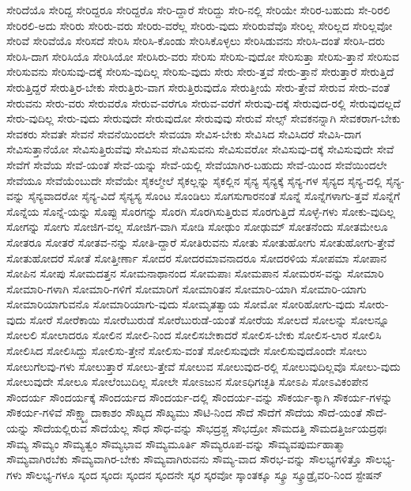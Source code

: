 {ಸೇರಿದೆಯೊ
ಸೇರಿದ್ದ
ಸೇರಿದ್ದರೂ
ಸೇರಿದ್ದರೊ
ಸೇರಿ-ದ್ದಾರೆ
ಸೇರಿದ್ದು
ಸೇರಿ-ನಲ್ಲಿ
ಸೇರಿಯೇ
ಸೇರಿರ-ಬಹುದು
ಸೇ-ರಿರಲಿ
ಸೇರಿರಲಿ-ಅದು
ಸೇರಿರು
ಸೇರಿರು-ವರು
ಸೇರಿರು-ವರೆಲ್ಲ
ಸೇರಿರು-ವುದು
ಸೇರಿರುವೆವೊ
ಸೇರಿಲ್ಲ
ಸೇರಿಲ್ಲದ
ಸೇರಿಲ್ಲವೋ
ಸೇರಿವೆ
ಸೇರಿವೆಯೊ
ಸೇರಿಸದೆ
ಸೇರಿಸಿ
ಸೇರಿಸಿ-ಕೊಂಡು
ಸೇರಿಸಿಕೊಳ್ಳಲು
ಸೇರಿಸಿಡುವನು
ಸೇರಿಸಿ-ದಂತೆ
ಸೇರಿಸಿ-ದರು
ಸೇರಿಸಿ-ದಾಗ
ಸೇರಿಸಿಯೊ
ಸೇರಿಸಿಯೋ
ಸೇರಿಸಿರು-ವರು
ಸೇರಿಸು
ಸೇರಿಸು-ವುದೋ
ಸೇರಿಸುತ್ತಾ
ಸೇರಿಸು-ತ್ತಾನೆ
ಸೇರಿಸುವ
ಸೇರಿಸುವನು
ಸೇರಿಸುವು-ದಕ್ಕೆ
ಸೇರಿಸು-ವುದಿಲ್ಲ
ಸೇರಿಸು-ವುದು
ಸೇರು
ಸೇರು-ತ್ತವೆ
ಸೇರು-ತ್ತಾನೆ
ಸೇರುತ್ತಾರೆ
ಸೇರುತ್ತಿದೆ
ಸೇರುತ್ತಿದ್ದರೆ
ಸೇರುತ್ತಿರ-ಬೇಕು
ಸೇರುತ್ತಿರು-ವಾಗ
ಸೇರುತ್ತಿರುವುದೊ
ಸೇರುತ್ತೀಯೆ
ಸೇರು-ತ್ತೇವೆ
ಸೇರುವ
ಸೇರು-ವಂತೆ
ಸೇರುವನು
ಸೇರು-ವರು
ಸೇರುವರೊ
ಸೇರುವ-ವರೆಗೂ
ಸೇರುವ-ವರೆಗೆ
ಸೇರುವು-ದಕ್ಕೆ
ಸೇರುವುದ-ರಲ್ಲಿ
ಸೇರುವುದಲ್ಲದೆ
ಸೇರು-ವುದಿಲ್ಲ
ಸೇರು-ವುದು
ಸೇರುವುದೇ
ಸೇರುವುದೋ
ಸೇರುವುವು
ಸೇರುವೆ
ಸೇಲ್ಸ್
ಸೇವಕನನ್ನಾಗಿ
ಸೇವಕರಾಗ-ಬೇಕು
ಸೇವಕರು
ಸೇವತೇ
ಸೇವನೆ
ಸೇವನೆಯಿಂದಲೇ
ಸೇವಯಾ
ಸೇವಿಸ-ಬೇಕು
ಸೇವಿಸಿದ
ಸೇವಿಸಿದರೆ
ಸೇವಿಸಿ-ದಾಗ
ಸೇವಿಸುತ್ತಾನೆಯೋ
ಸೇವಿಸುತ್ತಿರುವೆವು
ಸೇವಿಸುವ
ಸೇವಿಸುವನು
ಸೇವಿಸುವರೋ
ಸೇವಿಸುವು-ದಕ್ಕೆ
ಸೇವಿಸುವುದೇ
ಸೇವೆ
ಸೇವೆಗೆ
ಸೇವೆಯ
ಸೇವೆ-ಯಂತೆ
ಸೇವೆ-ಯನ್ನು
ಸೇವೆ-ಯಲ್ಲಿ
ಸೇವೆಯಾಗಿರ-ಬಹುದು
ಸೇವೆ-ಯಿಂದ
ಸೇವೆಯಿಂದಲೇ
ಸೇವೆಯೂ
ಸೇವೆಯೆಂಬುದೇ
ಸೇವೆಯೇ
ಸೈಕಲ್ಮೇಲೆ
ಸೈಕಲ್ಲನ್ನು
ಸೈಕಲ್ಲಿನ
ಸೈನ್ಯ
ಸೈನ್ಯಕ್ಕೆ
ಸೈನ್ಯ-ಗಳ
ಸೈನ್ಯದ
ಸೈನ್ಯ-ದಲ್ಲಿ
ಸೈನ್ಯ-ವನ್ನು
ಸೈನ್ಯವಾದರೋ
ಸೈನ್ಯ-ವಿದೆ
ಸೈನ್ಯಸ್ಯ
ಸೊಂಟ
ಸೊಂಡಿಲು
ಸೊಗಸುಗಾರನಂತೆ
ಸೊನ್ನೆ
ಸೊನ್ನೆಗಳಾಗು-ತ್ತವೆ
ಸೊನ್ನೆಗೆ
ಸೊನ್ನೆಯ
ಸೊನ್ನೆ-ಯನ್ನು
ಸೊಪ್ಪು
ಸೊರಗನ್ನು
ಸೊರಗಿ
ಸೊರಗಿಸುತ್ತಿರುವ
ಸೊರಗುತ್ತಿದೆ
ಸೊಳ್ಳೆ-ಗಳು
ಸೋಕು-ವುದಿಲ್ಲ
ಸೋಗನ್ನು
ಸೋಗು
ಸೋಜಿಗ-ವಲ್ಲ
ಸೋಜಿಗ-ವಾಗಿ
ಸೋಡಿ
ಸೋಢುಂ
ಸೋಢುಮ್
ಸೋತನೆಂದು
ಸೋತಮೇಲೂ
ಸೋತರೂ
ಸೋತರೆ
ಸೋತವ-ನನ್ನು
ಸೋತಿ-ದ್ದಾರೆ
ಸೋತಿರುವನು
ಸೋತು
ಸೋತುಹೋಗು
ಸೋತುಹೋಗು-ತ್ತೇವೆ
ಸೋತುಹೋದರೆ
ಸೋತೆ
ಸೋತ್ತೀರ್ಣಾ
ಸೋದರ
ಸೋದರಮಾವನಾದರೂ
ಸೋದರಳಿಯ
ಸೋಪಮಾ
ಸೋಪಾನ
ಸೋಪಿನ
ಸೋಪು
ಸೋಮದತ್ತನ
ಸೋಮನಾಥಾನಂದ
ಸೋಮಪಾಃ
ಸೋಮಪಾನ
ಸೋಮರಸ-ವನ್ನು
ಸೋಮಾರಿ
ಸೋಮಾರಿ-ಗಳಾಗಿ
ಸೋಮಾರಿ-ಗಳಿಗೆ
ಸೋಮಾರಿಗೆ
ಸೋಮಾರಿತನ
ಸೋಮಾರಿ-ಯಾಗಿ
ಸೋಮಾರಿ-ಯಾಗು
ಸೋಮಾರಿಯಾಗುವನೊ
ಸೋಮಾರಿಯಾಗು-ವುದು
ಸೋಮೃತತ್ವಾಯ
ಸೋಮೋ
ಸೋರಿಹೋಗು-ವುದು
ಸೋರು-ವುದು
ಸೋರೆ
ಸೋರೆಕಾಯಿ
ಸೋರೆಬುರುಡೆ
ಸೋರೆಬುರುಡೆ-ಯಂತೆ
ಸೋರೆಯ
ಸೋಲದೆ
ಸೋಲನ್ನು
ಸೋಲನ್ನೂ
ಸೋಲಲಿ
ಸೋಲಾದರೂ
ಸೋಲಿನ
ಸೋಲಿ-ನಿಂದ
ಸೋಲಿಸಬೇಕಾದರೆ
ಸೋಲಿಸ-ಬೇಕು
ಸೋಲಿಸ-ಲಾರ
ಸೋಲಿಸಿ
ಸೋಲಿಸಿದ
ಸೋಲಿಸಿದ್ದು
ಸೋಲಿಸು-ತ್ತೇನೆ
ಸೋಲಿಸು-ವಂತೆ
ಸೋಲಿಸುವುದೇ
ಸೋಲಿಸುವುದೊಂದೇ
ಸೋಲು
ಸೋಲುಗೆಲವು-ಗಳು
ಸೋಲುತ್ತಾರೆ
ಸೋಲು-ತ್ತೇವೆ
ಸೋಲುವ
ಸೋಲುವುದ-ರಲ್ಲಿ
ಸೋಲುವುದಿಲ್ಲವೊ
ಸೋಲು-ವುದು
ಸೋಲುವುದೇ
ಸೋಲೂ
ಸೋಲೆಂಬುದಿಲ್ಲ
ಸೋಲೇ
ಸೋಽಜುನ
ಸೋಽಧಿಗಚ್ಛತಿ
ಸೋಽಪಿ
ಸೋಽವಿಕಂಪೇನ
ಸೌಂದರ್ಯ
ಸೌಂದರ್ಯಕ್ಕೆ
ಸೌಂದರ್ಯದ
ಸೌಂದರ್ಯ-ದಲ್ಲಿ
ಸೌಂದರ್ಯ-ವನ್ನು
ಸೌಕರ್ಯ-ಕ್ಕಾಗಿ
ಸೌಕರ್ಯ-ಗಳನ್ನು
ಸೌಕರ್ಯ-ಗಳಿವೆ
ಸೌಕ್ಷ್ಮ್ಯಾದಾಕಾಶಂ
ಸೌಖ್ಯದ
ಸೌಖ್ಯಮು
ಸೌಟಿ-ನಿಂದ
ಸೌದೆ
ಸೌದೆಗೆ
ಸೌದೆಯ
ಸೌದೆ-ಯಂತೆ
ಸೌದೆ-ಯನ್ನು
ಸೌದೆಯಲ್ಲಿರುವ
ಸೌದೆಯೆಲ್ಲ
ಸೌಧ
ಸೌಧ-ವನ್ನು
ಸೌಭದ್ರಶ್ಚ
ಸೌಭದ್ರೋ
ಸೌಮದತ್ತಿ
ಸೌಮದತ್ತಿರ್ಜಯದ್ರಥಃ
ಸೌಮ್ಯ
ಸೌಮ್ಯಂ
ಸೌಮ್ಯತ್ವಂ
ಸೌಮ್ಯಭಾವ
ಸೌಮ್ಯಮೂರ್ತಿ
ಸೌಮ್ಯರೂಪ-ವನ್ನು
ಸೌಮ್ಯವಪುರ್ಮಹಾತ್ಮಾ
ಸೌಮ್ಯವಾಗಿರಬೆಕು
ಸೌಮ್ಯವಾಗಿರ-ಬೇಕು
ಸೌಮ್ಯವಾಗಿರುವನು
ಸೌಮ್ಯ-ವಾದ
ಸೌರಭ-ವನ್ನು
ಸೌಲಭ್ಯಗಳಿತ್ತೊ
ಸೌಲಭ್ಯ-ಗಳು
ಸೌಲಭ್ಯ-ಗಳೂ
ಸ್ಕಂದ
ಸ್ಕಂದಃ
ಸ್ಕಂದನ
ಸ್ಕಂದನೇ
ಸ್ಕರ
ಸ್ಕರವೋ
ಸ್ಕಾಂತಕ್ಕೂ
ಸ್ಕ್ರೂ
ಸ್ಕ್ರೂಡ್ರೈವರಿ-ನಿಂದ
ಸ್ಟೇಷನ್
}
